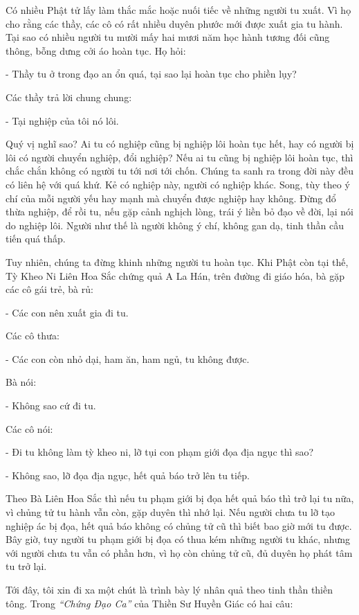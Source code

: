 \documentclass[
  12pt,
  oneside]{book}
\begin{document}
Có nhiều Phật tử lấy làm thắc mắc hoặc nuối tiếc về những người tu xuất. Vì họ cho rằng các thầy, các cô có rất nhiều duyên phước mới được xuất gia tu hành. Tại sao có nhiều người tu mười mấy hai mươi năm học hành tương đối cũng thông, bỗng dưng cởi áo hoàn tục. Họ hỏi:

- Thầy tu ở trong đạo an ổn quá, tại sao lại hoàn tục cho phiền lụy?

Các thầy trả lời chung chung:

- Tại nghiệp của tôi nó lôi.

Quý vị nghĩ sao? Ai tu có nghiệp cũng bị nghiệp lôi hoàn tục hết, hay có người bị lôi có người chuyển nghiệp, đổi nghiệp? Nếu ai tu cũng bị nghiệp lôi hoàn tục, thì chắc chắn không có người tu tới nơi tới chốn. Chúng ta sanh ra trong đời này đều có liên hệ với quá khứ. Kẻ có nghiệp này, người có nghiệp khác. Song, tùy theo ý chí của mỗi người yếu hay mạnh mà chuyển được nghiệp hay không. Đừng đổ thừa nghiệp, để rồi tu, nếu gặp cảnh nghịch lòng, trái ý liền bỏ đạo về đời, lại nói do nghiệp lôi. Người như thế là người không ý chí, không gan dạ, tinh thần cầu tiến quá thấp.

Tuy nhiên, chúng ta đừng khinh những người tu hoàn tục. Khi Phật còn tại thế, Tỳ Kheo Ni Liên Hoa Sắc chứng quả A La Hán, trên đường đi giáo hóa, bà gặp các cô gái trẻ, bà rủ:

- Các con nên xuất gia đi tu.

Các cô thưa:

- Các con còn nhỏ dại, ham ăn, ham ngủ, tu không được.

Bà nói:

- Không sao cứ đi tu.

Các cô nói:

- Đi tu không làm tỳ kheo ni, lỡ tụi con phạm giới đọa địa ngục thì sao?

- Không sao, lỡ đọa địa ngục, hết quả báo trở lên tu tiếp.

Theo Bà Liên Hoa Sắc thì nếu tu phạm giới bị đọa hết quả báo thì trở lại tu nữa, vì chủng tử tu hành vẫn còn, gặp duyên thì nhớ lại. Nếu người chưa tu lỡ tạo nghiệp ác bị đọa, hết quả báo không có chủng tử cũ thì biết bao giờ mới tu được. Bây giờ, tuy người tu phạm giới bị đọa có thua kém những người tu khác, nhưng với người chưa tu vẫn có phần hơn, vì họ còn chủng tử cũ, đủ duyên họ phát tâm tu trở lại.

Tới đây, tôi xin đi xa một chút là trình bày lý nhân quả theo tinh thần thiền tông. Trong \emph{``Chứng Đạo Ca''} của Thiền Sư Huyền Giác có hai câu:
\end{document}
